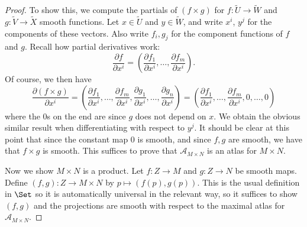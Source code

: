 \documentclass[11pt, letterpaper]{article}
\theoremstyle{theorem}
\begin{document}
\begin{proof}
	To show this, we compute the partials of $(f\times g)$ for $f : \widetilde{U}  \to \widetilde{W} $ and $g : \widetilde{V}  \to \widetilde{X} $ smooth functions. Let $x\in \widetilde{U} $ and $y\in \widetilde{W} $, and write $x^i$, $y^j$ for the components of these vectors. Also write $f_i,g_j$ for the component functions of $f$ and $g$. Recall how partial derivatives work:
	\[
		\frac{\partial f}{\partial x^i}=\left( \frac{\partial f_1}{\partial x^i} , \ldots , \frac{\partial f_m}{\partial x^i}  \right) 
	.\]
	Of course, we then have
	\[
		\frac{\partial (f\times g)}{\partial x^i} =\left( \frac{\partial f_1}{\partial x^i} , \ldots ,\frac{\partial f_m}{\partial x^i} , \frac{\partial g_1}{\partial x^i} , \ldots , \frac{\partial g_n}{\partial x^i}  \right) =\left( \frac{\partial f_1}{\partial x^i} , \ldots , \frac{\partial f_m}{\partial x^i} , 0, \ldots ,0 \right) 
	\]
	where the 0s on the end are since $g$ does not depend on $x$. We obtain the obvious similar result when differentiating with respect to $y^j$. It should be clear at this point that since the constant map 0 is smooth, and since $f,g$ are smooth, we have that $f\times g$ is smooth. This suffices to prove that $\mathcal{A} _{M\times N} $ is an atlas for $M\times N$.
	
	Now we show $M\times N$ is a product. Let $f : Z \to M$ and $g : Z \to N$ be smooth maps. Define $(f,g): Z \to M\times N$ by $p\mapsto (f(p),g(p))$. This is the usual definition in $\Set $ so it is automatically universal in the relevant way, so it suffices to show $(f,g)$ and the projections are smooth with respect to the maximal atlas for $\mathcal{A} _{M\times N} $.


\end{proof}
\end{document}
